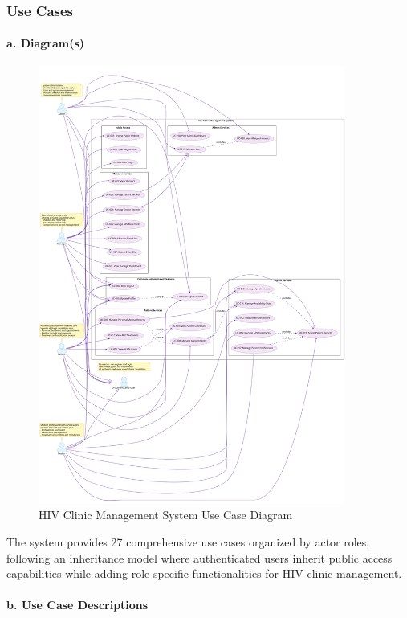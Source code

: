 \documentclass[12pt,a4paper]{article}
\begin{document}
\subsubsection{Use Cases}

\paragraph{a. Diagram(s)}

\begin{figure}[H]
\centering
\includegraphics[width=0.9\textwidth]{diagrams/use_case_diagram.svg}
\caption{HIV Clinic Management System Use Case Diagram}
\label{fig:use-case-diagram}
\end{figure}

The system provides 27 comprehensive use cases organized by actor roles, following an inheritance model where authenticated users inherit public access capabilities while adding role-specific functionalities for HIV clinic management.

\paragraph{b. Use Case Descriptions}
\end{document}
